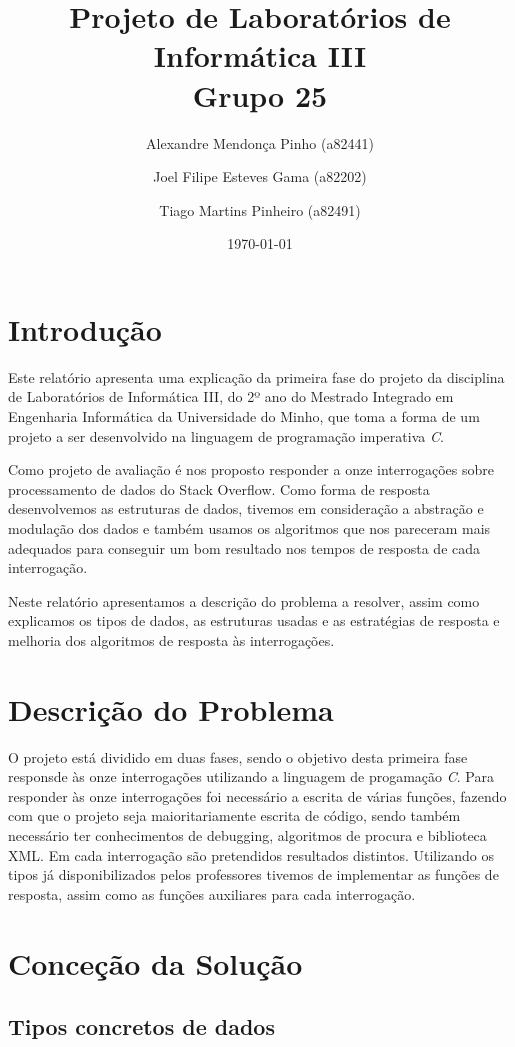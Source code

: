 \documentclass[10pt]{report}
\title{Projeto de Laboratórios de Informática III\\Grupo 25	}
\author{Alexandre Mendonça Pinho (a82441) \and Joel Filipe Esteves Gama (a82202) \and Tiago Martins Pinheiro (a82491)}
\date{\today}
\newcommand\tab[1][0.5cm]{\hspace*{#1}}
\begin{document}
\maketitle

\tableofcontents
\chapter{Introdução}
\label{sec:intro}

\tab Este relatório apresenta uma explicação da primeira fase do projeto da disciplina de Laboratórios de Informática III, do 2º ano do Mestrado Integrado em Engenharia Informática da Universidade do Minho, que toma a forma de um projeto a ser desenvolvido na linguagem de programação imperativa \textit{C}.

Como projeto de avaliação é nos proposto responder a onze interrogações sobre processamento de dados do Stack Overflow. Como forma de resposta desenvolvemos as estruturas de dados, tivemos em consideração a abstração e modulação dos dados e também usamos os algoritmos que nos pareceram mais adequados para conseguir um bom resultado nos tempos de resposta de cada interrogação.

Neste relatório apresentamos a descrição do problema a resolver, assim como explicamos os tipos de dados, as estruturas usadas e as estratégias de resposta e melhoria dos algoritmos de resposta às interrogações.
\chapter{Descrição do Problema}
\label{sec:problema}

\tab O projeto está dividido em duas fases, sendo o objetivo desta primeira fase responsde às onze interrogações utilizando a linguagem de progamação \textit{C}. Para responder às onze interrogações foi necessário a escrita de várias funções, fazendo com que o projeto seja maioritariamente escrita de código, sendo também necessário ter conhecimentos de debugging, algoritmos de procura e biblioteca XML.
Em cada interrogação são pretendidos resultados distintos. Utilizando os tipos já disponibilizados pelos professores tivemos de implementar as funções de resposta, assim como as funções auxiliares para cada interrogação.

\chapter{Conceção da Solução}
\section{Tipos concretos de dados}
\end{document}
